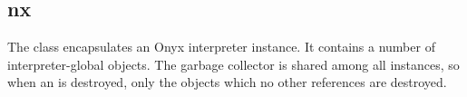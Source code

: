 %
%
%
%
%

\subsection{nx}
\label{nx}

The  class encapsulates an Onyx interpreter instance.  It contains
a number of interpreter-global objects.  The garbage collector is shared among
all  instances, so when an  is destroyed, only the
objects which no other  references are destroyed.

